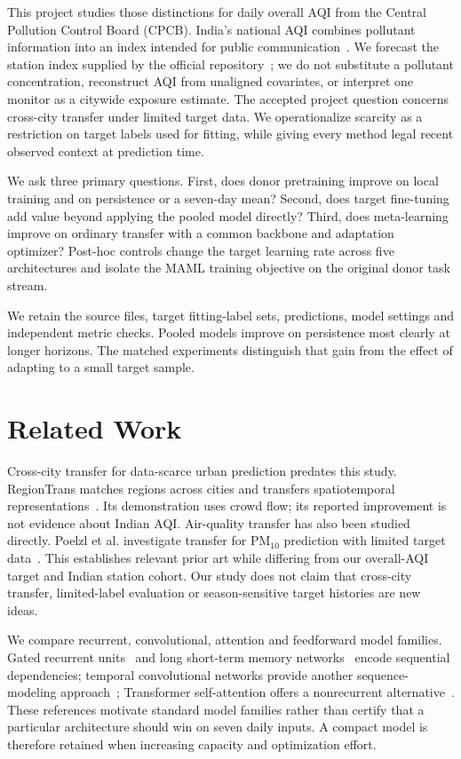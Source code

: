 \documentclass[conference]{IEEEtran}
\begin{document}
This project studies those distinctions for daily overall AQI from the Central Pollution Control Board (CPCB). India's national AQI combines pollutant information into an index intended for public communication~\cite{cpcb_report}. We forecast the station index supplied by the official repository~\cite{cpcb_data}; we do not substitute a pollutant concentration, reconstruct AQI from unaligned covariates, or interpret one monitor as a citywide exposure estimate. The accepted project question concerns cross-city transfer under limited target data. We operationalize scarcity as a restriction on target labels used for fitting, while giving every method legal recent observed context at prediction time.

We ask three primary questions. First, does donor pretraining improve on local training and on persistence or a seven-day mean? Second, does target fine-tuning add value beyond applying the pooled model directly? Third, does meta-learning improve on ordinary transfer with a common backbone and adaptation optimizer? Post-hoc controls change the target learning rate across five architectures and isolate the MAML training objective on the original donor task stream.

We retain the source files, target fitting-label sets, predictions, model settings and independent metric checks. Pooled models improve on persistence most clearly at longer horizons. The matched experiments distinguish that gain from the effect of adapting to a small target sample.

\section{Related Work}
Cross-city transfer for data-scarce urban prediction predates this study. RegionTrans matches regions across cities and transfers spatiotemporal representations~\cite{regiontrans}. Its demonstration uses crowd flow; its reported improvement is not evidence about Indian AQI. Air-quality transfer has also been studied directly. Poelzl et al. investigate transfer for PM$_{10}$ prediction with limited target data~\cite{poelzl}. This establishes relevant prior art while differing from our overall-AQI target and Indian station cohort. Our study does not claim that cross-city transfer, limited-label evaluation or season-sensitive target histories are new ideas.

We compare recurrent, convolutional, attention and feedforward model families. Gated recurrent units~\cite{cho} and long short-term memory networks~\cite{lstm} encode sequential dependencies; temporal convolutional networks provide another sequence-modeling approach~\cite{tcn}; Transformer self-attention offers a nonrecurrent alternative~\cite{transformer}. These references motivate standard model families rather than certify that a particular architecture should win on seven daily inputs. A compact model is therefore retained when increasing capacity and optimization effort.
\end{document}

